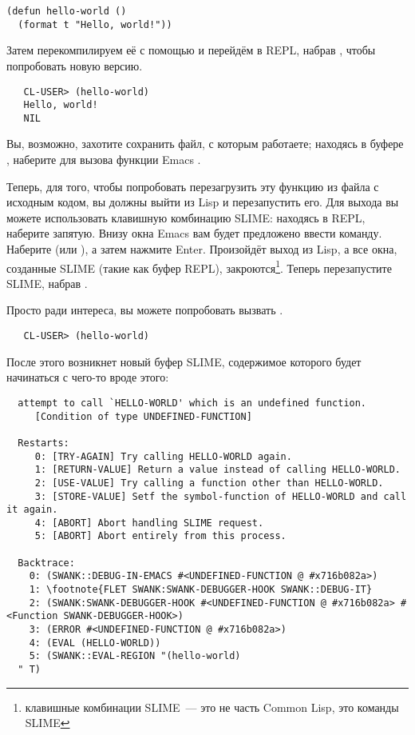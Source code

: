 \begin{lstlisting}
(defun hello-world ()
  (format t "Hello, world!"))
\end{lstlisting}

Затем перекомпилируем её с помощью  и перейдём в REPL, набрав , чтобы
попробовать новую версию.

\begin{verbatim}
   CL-USER> (hello-world)
   Hello, world!
   NIL
\end{verbatim}

Вы, возможно, захотите сохранить файл, с которым работаете; находясь в буфере
, наберите  для вызова функции Emacs .

Теперь, для того, чтобы попробовать перезагрузить эту функцию из файла с исходным кодом,
вы должны выйти из Lisp и перезапустить его. Для выхода вы можете использовать клавишную
комбинацию SLIME: находясь в REPL, наберите запятую. Внизу окна Emacs вам будет предложено
ввести команду. Наберите  (или ), а затем нажмите Enter. Произойдёт выход из
Lisp, а все окна, созданные SLIME (такие как буфер REPL), закроются\footnote{клавишные
  комбинации SLIME~--- это не часть Common Lisp, это команды SLIME}. Теперь перезапустите
SLIME, набрав .

Просто ради интереса, вы можете попробовать вызвать .

\begin{verbatim}
   CL-USER> (hello-world)
\end{verbatim}

После этого возникнет новый буфер SLIME, содержимое которого будет начинаться с чего-то
вроде этого:

\begin{verbatim}
  attempt to call `HELLO-WORLD' which is an undefined function.
     [Condition of type UNDEFINED-FUNCTION]
  
  Restarts:
     0: [TRY-AGAIN] Try calling HELLO-WORLD again.
     1: [RETURN-VALUE] Return a value instead of calling HELLO-WORLD.
     2: [USE-VALUE] Try calling a function other than HELLO-WORLD.
     3: [STORE-VALUE] Setf the symbol-function of HELLO-WORLD and call it again.
     4: [ABORT] Abort handling SLIME request.
     5: [ABORT] Abort entirely from this process.
  
  Backtrace:
    0: (SWANK::DEBUG-IN-EMACS #<UNDEFINED-FUNCTION @ #x716b082a>)
    1: \footnote{FLET SWANK:SWANK-DEBUGGER-HOOK SWANK::DEBUG-IT}
    2: (SWANK:SWANK-DEBUGGER-HOOK #<UNDEFINED-FUNCTION @ #x716b082a> #<Function SWANK-DEBUGGER-HOOK>)
    3: (ERROR #<UNDEFINED-FUNCTION @ #x716b082a>)
    4: (EVAL (HELLO-WORLD))
    5: (SWANK::EVAL-REGION "(hello-world)
  " T)
\end{verbatim}

